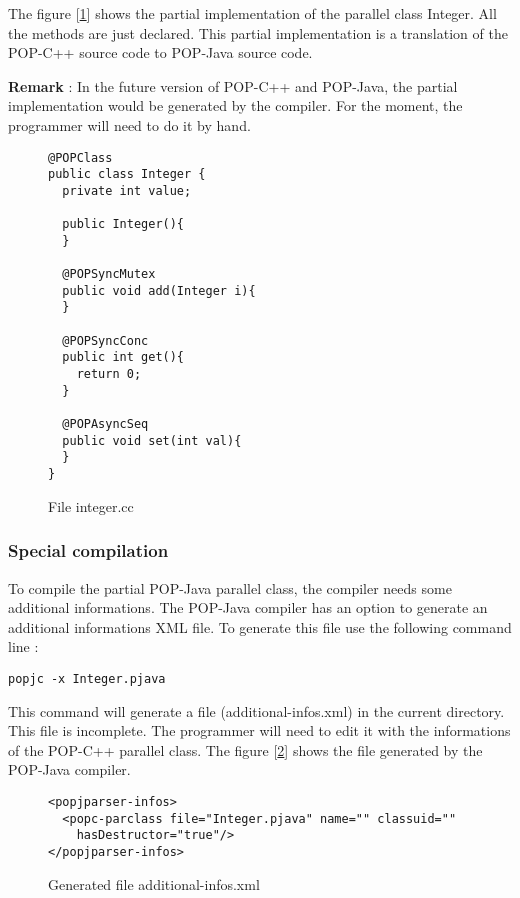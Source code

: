 The figure [\ref{fig:file_integer.pjava}] shows the partial implementation of the parallel class Integer. All the methods are just declared. This partial implementation is a translation of the POP-C++ source code to POP-Java source code. \s

\textbf{Remark} : In the future version of POP-C++ and POP-Java, the partial implementation would be generated by the compiler. For the moment, the programmer will need to do it by hand.
\begin{figure}[ht]
	\caption{File integer.cc}
	\label{fig:file_integer.pjava}
\begin{lstlisting}
@POPClass
public class Integer {
  private int value;

  public Integer(){
  }

  @POPSyncMutex
  public void add(Integer i){
  }

  @POPSyncConc
  public int get(){
	return 0;  
  }
  
  @POPAsyncSeq
  public void set(int val){
  }
}
\end{lstlisting}
\end{figure}


\pagebreak
\subsubsection{Special compilation}
To compile the partial POP-Java parallel class, the compiler needs some additional informations. The POP-Java compiler has an option to generate an additional informations XML file. To generate this file use the following command line : 

\begin{lstlisting}
popjc -x Integer.pjava
\end{lstlisting}\s

This command will generate a file (additional-infos.xml) in the current directory. This file is incomplete. The programmer will need to edit it with the informations of the POP-C++ parallel class. The figure [\ref{fig:add_info_xml}] shows the file generated by the POP-Java compiler.

\begin{figure}[ht]
	\caption{Generated file additional-infos.xml}
	\label{fig:add_info_xml}
\begin{lstlisting}
<popjparser-infos>
  <popc-parclass file="Integer.pjava" name="" classuid="" 
    hasDestructor="true"/>
</popjparser-infos>
\end{lstlisting}
\end{figure}

